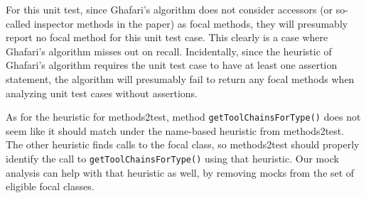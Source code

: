 For this unit test, since Ghafari's algorithm does not consider accessors (or so-called inspector methods in the paper) as focal methods, they will presumably report no focal method for this unit test case. This clearly is a case where Ghafari's algorithm misses out on recall.
Incidentally, since the heuristic of Ghafari's algorithm requires the unit test case to have at least one assertion statement, the algorithm will presumably fail to return any focal methods when analyzing unit test cases without assertions.

As for the heuristic for methods2test, method \texttt{getToolChainsForType()} does not seem like it should match under the name-based heuristic from methods2test. The other heuristic finds calls to the focal class, so methods2test should properly identify the call to \texttt{getToolChainsForType()} using that heuristic. Our mock analysis can help with that heuristic as well, by removing mocks from the set of eligible focal classes.

\begin{table*}
	\centering
	\caption{Comparison of \% of test cases with reported focal methods by the two automated focal method detection algorithms.}
	\vspace*{.5em}
	\label{tab:focal-method-algorithm-comparison}
\end{table*}


